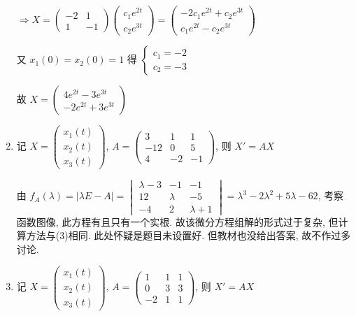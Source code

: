\begin{enumerate}
			       \( \Rightarrow X = \begin{pmatrix}
				       -2 & 1  \\
				       1  & -1
			       \end{pmatrix}\begin{pmatrix}
				       c_{1}e^{2t} \\
				       c_{2}e^{3t}
			       \end{pmatrix} = \begin{pmatrix}
				       -2c_{1}e^{2t} + c_{2}e^{3t} \\
				       c_{1}e^{2t} - c_{2}e^{3t}
			       \end{pmatrix} \)

			       又 \( x_{1}(0) = x_{2}(0) = 1 \) 得 \( \begin{cases}
				       c_{1} = -2 \\
				       c_{2} = -3
			       \end{cases} \)

			       故 \( X = \begin{pmatrix}
				       4e^{2t} - 3e^{3t} \\
				       -2e^{2t} + 3e^{3t}
			       \end{pmatrix} \)
			 \item %
			       记 \( X = \begin{pmatrix}
				       x_{1}(t) \\
				       x_{2}(t) \\
				       x_{3}(t)
			       \end{pmatrix} \), \( A = \begin{pmatrix}
				       3   & 1  & 1  \\
				       -12 & 0  & 5  \\
				       4   & -2 & -1
			       \end{pmatrix} \), 则 \( X' = AX \)

			       由 \( f_{A}(\lambda) = |\lambda E - A| = \begin{vmatrix}
				       \lambda-3 & -1      & -1        \\
				       12        & \lambda & -5        \\
				       -4        & 2       & \lambda+1
			       \end{vmatrix} = \lambda^{3} - 2\lambda^{2} + 5\lambda - 62 \), 考察函数图像, 此方程有且只有一个实根. 故该微分方程组解的形式过于复杂, 但计算方法与(3)相同. 此处怀疑是题目未设置好. 但教材也没给出答案, 故不作过多讨论.
			 \item %
			       记 \( X = \begin{pmatrix}
				       x_{1}(t) \\
				       x_{2}(t) \\
				       x_{3}(t)
			       \end{pmatrix} \), \( A = \begin{pmatrix}
				       1  & 1 & 1 \\
				       0  & 3 & 3 \\
				       -2 & 1 & 1
			       \end{pmatrix} \), 则 \( X' = AX \)


\end{enumerate}
